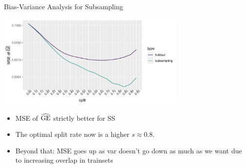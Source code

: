 \begin{vbframe}{Bias-Variance Analysis for Subsampling}

\begin{center}
\includegraphics[width=0.7\textwidth]{figure/eval-resampling-example-2}
\end{center}

\begin{itemize}
  \item MSE of $\widehat{\mathrm{GE}}$ strictly better for SS
  \item The optimal split rate now is a higher $s \approx 0.8$.
  \item Beyond that: MSE goes up as var doesn't go down as much as we want 
      due to increasing overlap in trainsets
\end{itemize}

\end{vbframe}


